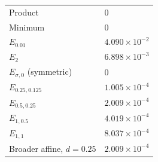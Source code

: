 \begin{tabular}{ll}
Product & $0$ \\
Minimum & $0$ \\
$E_{0.01}$ & $4.090\times10^{-2}$ \\
$E_2$ & $6.898\times10^{-3}$ \\
$E_{\sigma,0}$ (symmetric) & $0$ \\
$E_{0.25,0.125}$ & $1.005\times10^{-4}$ \\
$E_{0.5,0.25}$ & $2.009\times10^{-4}$ \\
$E_{1,0.5}$ & $4.019\times10^{-4}$ \\
$E_{1,1}$ & $8.037\times10^{-4}$ \\
Broader affine, $d=0.25$ & $2.009\times10^{-4}$ \\
\end{tabular}
